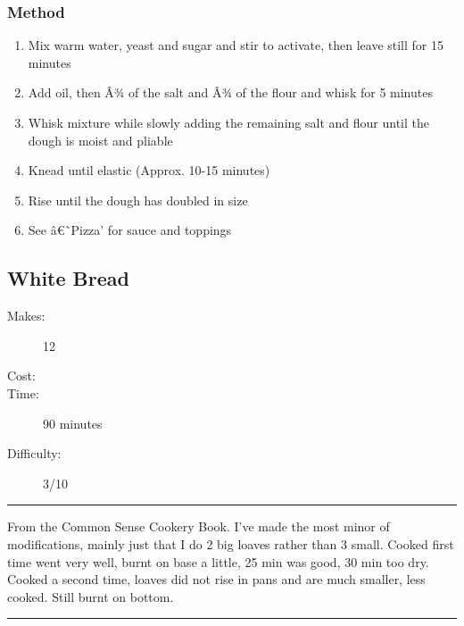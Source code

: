 \documentclass[]{article}
\begin{document}
\subsubsection*{\Large Method}
\begin{enumerate}[font=\huge\color{accent}]
	\item Mix warm water, yeast and sugar and stir to activate, then leave still for 15 minutes
	\item Add oil, then Â¾ of the salt and Â¾ of the flour and whisk for 5 minutes
	\item Whisk mixture while slowly adding the remaining salt and flour until the dough is moist and pliable
	\item Knead until elastic (Approx. 10-15 minutes)
	\item Rise until the dough has doubled in size
	\item See â€˜Pizza' for sauce and toppings
\end{enumerate}
\newpage
{}\label{rec:White Bread}
\subsection*{\center\huge White Bread}
\begin{description}
\item[Makes:] 12 
\item[Cost:] \textdollar
\item[Time:] 90 minutes
\item[Difficulty:] 3/10
\end{description}
\vspace{0.2cm}\hrule\vspace{0.5cm}
\begin{adjustwidth}{0.5 cm}{0.5 cm}

From the Common Sense Cookery Book. I've made the most minor of modifications, mainly just that I do 2 big loaves rather than 3 small. Cooked first time went very well, burnt on base a little, 25 min was good, 30 min too dry. Cooked a second time, loaves did not rise in pans and are much smaller, less cooked. Still burnt on bottom. \hfill{}\color{black}

\end{adjustwidth}
\vspace{0.5cm}\hrule
\end{document}
